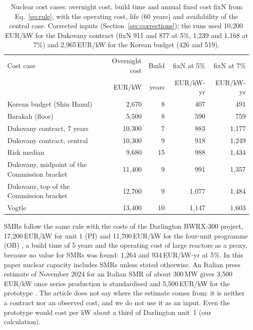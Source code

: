 \begin{table}[!tb]
\centering\footnotesize
\caption{Nuclear cost cases: overnight cost, build time and annual fixed cost fixN from Eq.~\eqref{eq:rule}, with the operating cost, life (60 years) and availability of the central case. Corrected inputs (Section~\ref{sec:corrections}); the runs used 10{,}200\,EUR/kW for the Dukovany contract (fixN 911 and 877 at 5\%, 1{,}239 and 1{,}168 at 7\%) and 2{,}965\,EUR/kW for the Korean budget (426 and 519).}\label{tab:cases}
\begin{tabular}{@{}lrrrr@{}}
\toprule
Cost case & Overnight cost & Build & fixN at 5\% & fixN at 7\%\\
 & EUR/kW & years & EUR/kW-yr & EUR/kW-yr\\
\midrule
Korean budget (Shin Hanul) & 2{,}670 & 8 & 407 & 491\\
Barakah (floor) & 5{,}500 & 8 & 590 & 759\\
Dukovany contract, 7 years & 10{,}300 & 7 & 883 & 1{,}177\\
Dukovany contract, central & 10{,}300 & 9 & 918 & 1{,}249\\
Risk median & 9{,}680 & 15 & 988 & 1{,}434\\
Dukovany, midpoint of the Commission bracket & 11{,}400 & 9 & 991 & 1{,}357\\
Dukovany, top of the Commission bracket & 12{,}700 & 9 & 1{,}077 & 1{,}484\\
Vogtle & 13{,}400 & 10 & 1{,}147 & 1{,}603\\
\bottomrule
\end{tabular}
\end{table}

SMRs follow the same rule with the costs of the Darlington BWRX-300 project, 17{,}200\,EUR/kW for unit 1 (PI) and 11{,}700\,EUR/kW for the four-unit programme (OB) \citep{POWERDarlington2025}, a build time of 5 years and the operating cost of large reactors as a proxy, because no value for SMRs was found: 1{,}264 and 934\,EUR/kW-yr at 5\%. In this paper nuclear capacity includes SMRs unless stated otherwise. An Italian press estimate of November 2024 for an Italian SMR of about 300\,MW gives 3{,}500\,EUR/kW once series production is standardised and 5{,}500\,EUR/kW for the prototype \citep{Sole2024SMR}. The article does not say where the estimate comes from: it is neither a contract nor an observed cost, and we do not use it as an input. Even the prototype would cost per kW about a third of Darlington unit~1 (our calculation).

